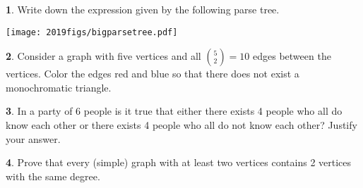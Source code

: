\documentclass[12pt]{article}
\theoremstyle{definition}
\newtheorem{problem}{}
\begin{document}
\begin{problem}
Write down the expression given by the following parse tree.\\
\centerline{\texttt{[image: 2019figs/bigparsetree.pdf]}}
\end{problem}


\begin{problem}
Consider a graph with five vertices and all $\binom{5}{2} = 10$ edges between the vertices. Color the edges red and blue so that there does not exist a monochromatic triangle. 
\end{problem}

\begin{problem}
In a party of 6 people is it true that  either there exists 4 people  who all do know each other or there exists 4 people who all do not know each other? Justify your answer.
\end{problem}

\begin{problem}
Prove that every (simple) graph with at least two vertices contains 2 vertices with the same degree.
\end{problem}
\end{document}
